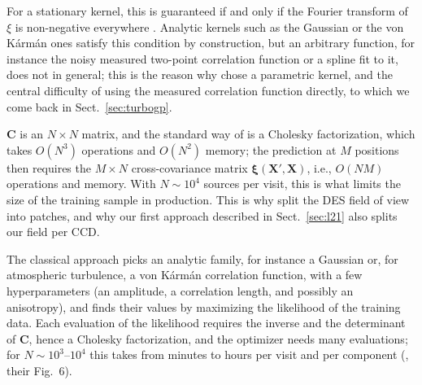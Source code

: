 
For a stationary kernel, this is guaranteed if and only if the Fourier transform of $\xi$ is non-negative 
everywhere \citep[Bochner's theorem;][]{bochner1933}.
Analytic kernels such as the Gaussian or the von K\'arm\'an ones satisfy this condition by construction, but an arbitrary 
function, for instance the noisy measured two-point correlation function or a spline fit to it, does not in general; this 
is the reason why  chose a parametric kernel, and the central difficulty of using the measured 
correlation function directly, to which we come back in Sect.~\ref{sec:turbogp}.

$\mathbf{C}$ is an $N \times N$ matrix, and the standard way of  is a Cholesky factorization, which
takes $O(N^3)$ operations and $O(N^2)$ memory; the prediction at $M$ positions  then requires the $M \times N$ cross-covariance
matrix $\boldsymbol{\xi}(\mathbf{X}', \mathbf{X})$, i.e., $O(NM)$ operations and memory.
With $N \sim 10^4$ sources per visit, this is what limits the size of the training sample in production. 
This is why  split the DES field of view into patches, and why our first approach described in
Sect.~\ref{sec:l21} also splits our field per CCD.

The classical approach picks an analytic family, for instance a Gaussian or, for atmospheric turbulence, a von K\'arm\'an correlation 
function, with a few hyperparameters (an amplitude, a correlation length, and possibly an anisotropy), and finds their values by 
maximizing the likelihood of the training data.
Each evaluation of the likelihood requires the inverse and the determinant of $\mathbf{C}$, hence a Cholesky factorization, and the 
optimizer needs many evaluations; for $N \sim 10^3$--$10^4$ this takes from minutes to hours per visit and per 
component (, their Fig.~6).

